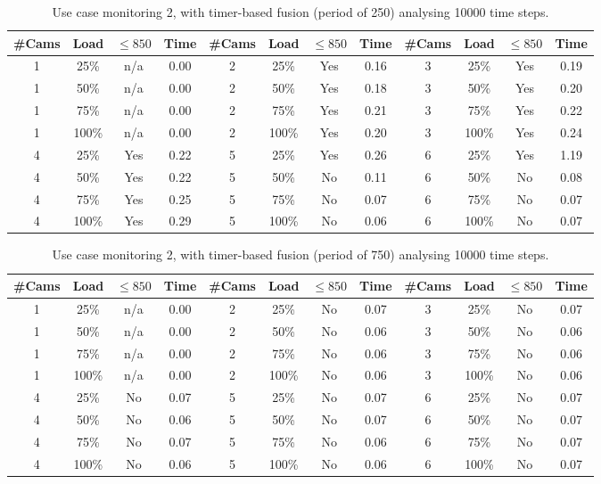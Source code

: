 \documentclass{article}
\begin{document}
\begin{table}
\centering
\begin{tabular}{|c|c|c|c|c|c|c|c|c|c|c|c|}
\hline
\#Cams & Load & $\leq 850$ & Time & \#Cams & Load & $\leq 850$ & Time & \#Cams & Load & $\leq 850$ & Time\\
\hline
1 & 25\% & n/a & 0.00 & 2 & 25\% & Yes & 0.16 & 3 & 25\% & Yes & 0.19\\
1 & 50\% & n/a & 0.00 & 2 & 50\% & Yes & 0.18 & 3 & 50\% & Yes & 0.20\\
1 & 75\% & n/a & 0.00 & 2 & 75\% & Yes & 0.21 & 3 & 75\% & Yes & 0.22\\
1 & 100\% & n/a & 0.00 & 2 & 100\% & Yes & 0.20 & 3 & 100\% & Yes & 0.24\\
\hline
4 & 25\% & Yes & 0.22 & 5 & 25\% & Yes & 0.26 & 6 & 25\% & Yes & 1.19\\
4 & 50\% & Yes & 0.22 & 5 & 50\% & No & 0.11 & 6 & 50\% & No & 0.08\\
4 & 75\% & Yes & 0.25 & 5 & 75\% & No & 0.07 & 6 & 75\% & No & 0.07\\
4 & 100\% & Yes & 0.29 & 5 & 100\% & No & 0.06 & 6 & 100\% & No & 0.07\\
\hline
\end{tabular}
\caption{Use case monitoring 2, with timer-based fusion (period of 250) analysing 10000 time steps.}
\end{table}


\begin{table}
\centering
\begin{tabular}{|c|c|c|c|c|c|c|c|c|c|c|c|}
\hline
\#Cams & Load & $\leq 850$ & Time & \#Cams & Load & $\leq 850$ & Time & \#Cams & Load & $\leq 850$ & Time\\
\hline
1 & 25\% & n/a & 0.00 & 2 & 25\% & No & 0.07 & 3 & 25\% & No & 0.07\\
1 & 50\% & n/a & 0.00 & 2 & 50\% & No & 0.06 & 3 & 50\% & No & 0.06\\
1 & 75\% & n/a & 0.00 & 2 & 75\% & No & 0.06 & 3 & 75\% & No & 0.06\\
1 & 100\% & n/a & 0.00 & 2 & 100\% & No & 0.06 & 3 & 100\% & No & 0.06\\
\hline
4 & 25\% & No & 0.07 & 5 & 25\% & No & 0.07 & 6 & 25\% & No & 0.07\\
4 & 50\% & No & 0.06 & 5 & 50\% & No & 0.07 & 6 & 50\% & No & 0.07\\
4 & 75\% & No & 0.07 & 5 & 75\% & No & 0.06 & 6 & 75\% & No & 0.07\\
4 & 100\% & No & 0.06 & 5 & 100\% & No & 0.06 & 6 & 100\% & No & 0.07\\
\hline
\end{tabular}
\caption{Use case monitoring 2, with timer-based fusion (period of 750) analysing 10000 time steps.}
\end{table}
\end{document}
